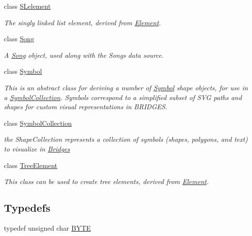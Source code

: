 \begin{DoxyCompactItemize}
class \hyperlink{classbridges_1_1_s_lelement}{S\+Lelement}
\begin{DoxyCompactList}\small\item\em The singly linked list element, derived from \hyperlink{classbridges_1_1_element}{Element}. \end{DoxyCompactList}\item 
class \hyperlink{classbridges_1_1_song}{Song}
\begin{DoxyCompactList}\small\item\em A \hyperlink{classbridges_1_1_song}{Song} object, used along with the Songs data source. \end{DoxyCompactList}\item 
class \hyperlink{classbridges_1_1_symbol}{Symbol}
\begin{DoxyCompactList}\small\item\em This is an abstract class for deriving a number of \hyperlink{classbridges_1_1_symbol}{Symbol} shape objects, for use in a \hyperlink{classbridges_1_1_symbol_collection}{Symbol\+Collection}. Symbols correspond to a simplified subset of S\+V\+G paths and shapes for custom visual representations in B\+R\+I\+D\+G\+E\+S. \end{DoxyCompactList}\item 
class \hyperlink{classbridges_1_1_symbol_collection}{Symbol\+Collection}
\begin{DoxyCompactList}\small\item\em the Shape\+Collection represents a collection of symbols (shapes, polygons, and text) to visualize in \hyperlink{classbridges_1_1_bridges}{Bridges} \end{DoxyCompactList}\item 
class \hyperlink{classbridges_1_1_tree_element}{Tree\+Element}
\begin{DoxyCompactList}\small\item\em This class can be used to create tree elements, derived from \hyperlink{classbridges_1_1_element}{Element}. \end{DoxyCompactList}\end{DoxyCompactItemize}
\subsection*{Typedefs}
\begin{DoxyCompactItemize}
\item 
typedef unsigned char \hyperlink{namespacebridges_a59b77ee45243ba85c701fb8ab298ef00}{B\+Y\+T\+E}
\end{DoxyCompactItemize}
